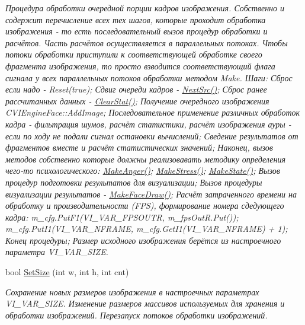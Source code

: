 \begin{DoxyCompactItemize}
\begin{DoxyCompactList}\small\item\em Процедура обработки очередной порции кадров изображения. Собственно и содержит перечисление всех тех шагов, которые проходит обработка изображения -\/ то есть последовательный вызов процедур обработки и расчётов. Часть расчётов осуществляется в параллельных потоках. Чтобы потоки обработки приступили к соответствующей обработке своего фрагмента изображения, то просто взводится соответствующий флага сигнала у всех параллельных потоков обработки методом Make. Шаги\+: Сброс если надо -\/ Reset(true); Сдвиг очереди кадров -\/ \hyperlink{class_c_v_i_engine_base_aa1aa2604f40dd77bc49ca6ff8fd81535}{Next\+Src()}; Сброс ранее рассчитанных данных -\/ \hyperlink{class_c_v_i_engine_base_a10d6138a2c8f4c4c946bf930c268be6b}{Clear\+Stat()}; Получение очередного изображения C\+V\+I\+Engine\+Face\+::\+Add\+Image; Последовательное применение различных обработок кадра -\/ фильтрация шумов, расчёт статистики, расчёт изображения ауры -\/ если по ходу не подали сигнал остановки вычислений; Сведение результатов от фрагментов вместе и расчёт статистических значений; Наконец, вызов методов собственно которые должны реализовавать методику определения чего-\/то психологического\+: \hyperlink{class_c_v_i_engine_base_adf949a2b1abf18f519937d3f787c5abf}{Make\+Anger()}; \hyperlink{class_c_v_i_engine_base_a746c67a403f60418bf26e1e686db0c0c}{Make\+Stress()}; \hyperlink{class_c_v_i_engine_base_aa77b261660041465a8d3e68a7088dd0d}{Make\+State()}; Вызов процедур подготовки результатов для визуализации; Вызов процедуры визуализации результатов -\/ \hyperlink{class_c_v_i_engine_base_a18c5dc58d55a37295b3dd4c451fb86fc}{Make\+Face\+Draw()}; Расчёт затраченного времени на обработку и производительности (F\+P\+S), формирование номера сдедующего кадра\+: m\+\_\+cfg.\+Put\+F1(V\+I\+\_\+\+V\+A\+R\+\_\+\+F\+P\+S\+O\+U\+T\+R, m\+\_\+fps\+Out\+R.\+Put()); m\+\_\+cfg.\+Put\+I1(V\+I\+\_\+\+V\+A\+R\+\_\+\+N\+F\+R\+A\+M\+E, m\+\_\+cfg.\+Get\+I1(\+V\+I\+\_\+\+V\+A\+R\+\_\+\+N\+F\+R\+A\+M\+E) + 1); Конец процедуры; Размер исходного изображения берётся из настроечного параметра V\+I\+\_\+\+V\+A\+R\+\_\+\+S\+I\+Z\+E. \end{DoxyCompactList}\item 
bool \hyperlink{class_c_v_i_engine_base_a930661f73cc7c449c166071631be595d}{Set\+Size} (int w, int h, int cnt)
\begin{DoxyCompactList}\small\item\em Сохранение новых размеров изображения в настроечных параметрах V\+I\+\_\+\+V\+A\+R\+\_\+\+S\+I\+Z\+E. Изменение размеров массивов используемых для хранения и обработки изображений. Перезапуск потоков обработки изображений. \end{DoxyCompactList}\item 

\end{DoxyCompactItemize}
